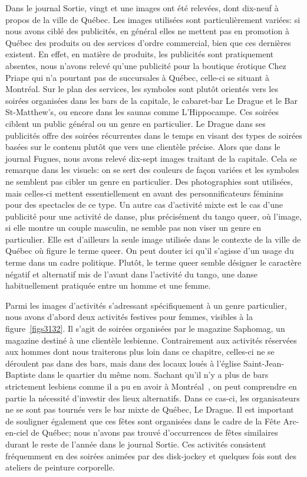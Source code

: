 Dans le journal Sortie, vingt et une images ont été relevées, dont dix-neuf à propos de la ville de Québec. 
Les images utilisées sont particulièrement variées: si nous avons ciblé des publicités, en général elles ne mettent pas en promotion à Québec des produits ou des services d'ordre commercial, bien que ces dernières existent. 
En effet, en matière de produits, les publicités sont pratiquement absentes, nous n'avons relevé qu'une publicité pour la boutique érotique Chez Priape qui n'a pourtant pas de succursales à Québec, celle-ci se situant à Montréal. 
Sur le plan des services, les symboles sont plutôt orientés vers les soirées organisées dans les bars de la capitale, le cabaret-bar Le Drague et le Bar St-Matthew’s, ou encore dans les saunas comme L'Hippocampe. 
Ces soirées ciblent un public général ou un genre en particulier. 
Le Drague dans ses publicités offre des soirées récurrentes dans le temps en visant des types de soirées basées sur le contenu plutôt que vers une clientèle précise. 
Alors que dans le journal Fugues, nous avons relevé dix-sept images traitant de la capitale. 
Cela se remarque dans les visuels: on se sert des couleurs de façon variées et les symboles ne semblent pas cibler un genre en particulier. 
Des photographies sont utilisées, mais celles-ci mettent essentiellement en avant des personnificateurs féminins pour des spectacles de ce type. 
Un autre cas d'activité mixte est le cas d'une publicité pour une activité de danse, plus précisément du tango queer, où l'image, si elle montre un couple masculin, ne semble pas non viser un genre en particulier. 
Elle est d'ailleurs la seule image utilisée dans le contexte de la ville de Québec où figure le terme queer.
On peut douter ici qu'il s'agisse d'un usage du terme dans un cadre politique. 
Plutôt, le terme queer semble désigner le caractère négatif et alternatif mis de l'avant dans l'activité du tango, une danse habituellement pratiquée entre un homme et une femme.

Parmi les images d'activités s'adressant spécifiquement à un genre particulier, nous avons d'abord deux activités festives pour femmes, visibles à la figure~\ref{figs3132}. 
Il s'agit de soirées organisées par le magazine Saphomag, un magazine destiné à une clientèle lesbienne. 
Contrairement aux activités réservées aux hommes dont nous traiterons plus loin dans ce chapitre, celles-ci ne se déroulent pas dans des bars, mais dans des locaux loués à l'église Saint-Jean-Baptiste dans le quartier du même nom. 
Sachant qu'il n'y a plus de bars strictement lesbiens comme il a pu en avoir à Montréal~\citep{Podmore2006}, on peut comprendre en partie la nécessité d'investir des lieux alternatifs. 
Dans ce cas-ci, les organisateurs ne se sont pas tournés vers le bar mixte de Québec, Le Drague. 
Il est important de souligner également que ces fêtes sont organisées dans le cadre de la Fête Arc-en-ciel de Québec; nous n'avons pas trouvé d'occurrences de fêtes similaires durant le reste de l'année dans le journal Sortie. 
Ces activités consistent fréquemment en des soirées animées par des disk-jockey et quelques fois sont des ateliers de peinture corporelle.

